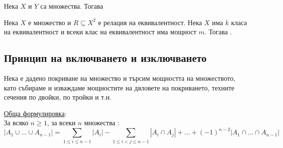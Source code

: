 \begin{principle}[на умножението]
    Нека \(X\) и \(Y\) са множества. Тогава 
\end{principle}

\begin{principle}[на делението]
    Нека \(X\) е множество и \(R \subseteq X^2\) е релация на еквивалентност. Нека \(X\) има \(k\) класа 
    на еквивалентност и всеки клас на еквивалентност има мощност \(m\). Тогава 
    .
\end{principle}

\subsection*{Принцип на включването и изключването}
\begin{principle}
    Нека е дадено покриване на множество и търсим мощността на множеството, като събираме и изваждаме 
    мощностите на дяловете на покриването, техните сечения по двойки, по тройки и т.н.

    \underline{Обща формулировка}: \\
    За всяко \(n \ge 1\), за всеки \(n\) множества : \\
    \begin{equation}
        |A_1 \cup ... \cup A_{n - 1}| = \sum_{1 \le i \le n - 1} |A_i| - \sum_{1 \le i < j \le n - 1} |A_i \cap A_j| 
        + ... + (-1)^{n - 2}|A_1 \cap ... \cap A_{n - 1}|
    \end{equation}
\end{principle}

